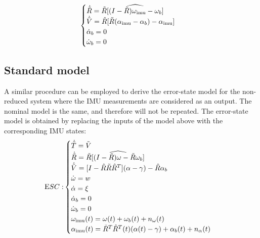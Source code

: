 {\begin{equation}
\begin{cases}
\dot{\tilde R} = \tilde R  \widehat{[(I- \tilde R) \omega_\mathrm{imu}  - \omega_b]} \\
\dot{\tilde V} = \hat R[ \tilde R(\alpha_\mathrm{imu}  - \alpha_b) - \alpha_\mathrm{imu} ] \\
\dot \alpha_b = 0 \\
\dot {\omega}_b = 0
\end{cases}
\end{equation}
%
\subsection{Standard  model}
%
A similar procedure can be employed to derive the error-state model for the non-reduced system where the IMU measurements are considered as an output. The nominal model is the same, and therefore will not be repeated. The error-state model is obtained by replacing the inputs of the model above with the corresponding IMU states:
\begin{equation}
{\mathrm ESC:}
\begin{cases}
\dot{\tilde T} = \tilde V \\
\dot{\tilde R} = \tilde R \widehat{[(I - \tilde R)\omega - \tilde R \omega_b]}  \\
\dot{\tilde V} =[I - \hat R \tilde R {\hat R}^T] (\alpha - \gamma) - \hat R \alpha_b \\
\dot {\omega} = w \\ 
\dot \alpha = \xi \\
\dot \alpha_b = 0 \\
\dot {\omega}_b = 0 \\
\omega_\mathrm{imu} (t) = \omega(t) + \omega_b(t) + n_{\omega}(t) \\ 
\alpha_\mathrm{imu} (t) = {\tilde R}^T {\hat R}^T(t) (\alpha(t)- \gamma) + \alpha_b(t) + n_{\alpha}(t) 
\end{cases}
\end{equation}
%
}
